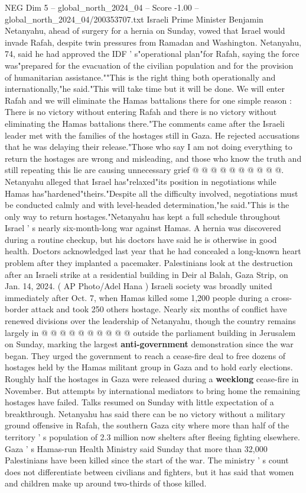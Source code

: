 \begin{textsample}{NEG Dim 5 – global\_north\_2024\_04 – Score -1.00 – global\_north\_2024\_04/200353707.txt}  \label{ex:f5_neg_164}
Israeli Prime Minister Benjamin Netanyahu, ahead of surgery for a hernia on Sunday, vowed that Israel would invade Rafah, despite twin pressures from Ramadan and Washington.
Netanyahu, 74, said he had approved the IDF ' s"operational plan"for Rafah, saying the force was"prepared for the evacuation of the civilian population and for the provision of humanitarian assistance.""This is the right thing both operationally and internationally,"he said."This will take time but it will be done.
We will enter Rafah and we will eliminate the Hamas battalions there for one simple reason : There is no victory without entering Rafah and there is no victory without eliminating the Hamas battalions there."The comments came after the Israeli leader met with the families of the hostages still in Gaza.
He rejected accusations that he was delaying their release."Those who say I am not doing everything to return the hostages are wrong and misleading, and those who know the truth and still repeating this lie are causing unnecessary grief @ @ @ @ @ @ @ @ @ @.
Netanyahu alleged that Israel has"relaxed"its position in negotiations while Hamas has"hardened"theirs."Despite all the difficulty involved, negotiations must be conducted calmly and with level-headed determination,"he said."This is the only way to return hostages."Netanyahu has kept a full schedule throughout Israel ' s nearly six-month-long war against Hamas.
A hernia was discovered during a routine checkup, but his doctors have said he is otherwise in good health.
Doctors acknowledged last year that he had concealed a long-known heart problem after they implanted a pacemaker.
Palestinians look at the destruction after an Israeli strike at a residential building in Deir al Balah, Gaza Strip, on Jan. 14, 2024. ( AP Photo/Adel Hana ) Israeli society was broadly united immediately after Oct. 7, when Hamas killed some 1,200 people during a cross-border attack and took 250 others hostage.
Nearly six months of conflict have renewed divisions over the leadership of Netanyahu, though the country remains largely in @ @ @ @ @ @ @ @ @ @ outside the parliament building in Jerusalem on Sunday, marking the largest \textbf{anti-government} demonstration since the war began.
They urged the government to reach a cease-fire deal to free dozens of hostages held by the Hamas militant group in Gaza and to hold early elections.
Roughly half the hostages in Gaza were released during a \textbf{weeklong} cease-fire in November.
But attempts by international mediators to bring home the remaining hostages have failed.
Talks resumed on Sunday with little expectation of a breakthrough.
Netanyahu has said there can be no victory without a military ground offensive in Rafah, the southern Gaza city where more than half of the territory ' s population of 2.3 million now shelters after fleeing fighting elsewhere.
Gaza ' s Hamas-run Health Ministry said Sunday that more than 32,000 Palestinians have been killed since the start of the war.
The ministry ' s count does not differentiate between civilians and fighters, but it has said that women and children make up around two-thirds of those killed.

\end{textsample}

